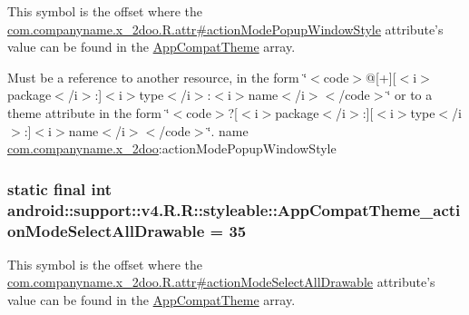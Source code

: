 This symbol is the offset where the \hyperlink{classcom_1_1companyname_1_1x__2doo_1_1_r_1_1attr_2c277af2d5ce1caa9df550b48a1d5a8f}{com.companyname.x\_\-2doo.R.attr\#actionModePopupWindowStyle} attribute's value can be found in the \hyperlink{classandroid_1_1support_1_1v4_1_1_r_1_1styleable_0873e92ba21076bb5a4aeadeb7f5779f}{AppCompatTheme} array.

Must be a reference to another resource, in the form \char`\"{}$<$code$>$@\mbox{[}+\mbox{]}\mbox{[}$<$i$>$package$<$/i$>$:\mbox{]}$<$i$>$type$<$/i$>$:$<$i$>$name$<$/i$>$$<$/code$>$\char`\"{} or to a theme attribute in the form \char`\"{}$<$code$>$?\mbox{[}$<$i$>$package$<$/i$>$:\mbox{]}\mbox{[}$<$i$>$type$<$/i$>$:\mbox{]}$<$i$>$name$<$/i$>$$<$/code$>$\char`\"{}.  name \hyperlink{namespacecom_1_1companyname_1_1x__2doo}{com.companyname.x\_\-2doo}:actionModePopupWindowStyle \hypertarget{classandroid_1_1support_1_1v4_1_1_r_1_1styleable_161a3ac1577d6c574603d52de21d3d13}{
\subsubsection[{AppCompatTheme\_\-actionModeSelectAllDrawable}]{\setlength{\rightskip}{0pt plus 5cm}static final int android::support::v4.R.R::styleable::AppCompatTheme\_\-actionModeSelectAllDrawable = 35}}
\label{classandroid_1_1support_1_1v4_1_1_r_1_1styleable_161a3ac1577d6c574603d52de21d3d13}


This symbol is the offset where the \hyperlink{classcom_1_1companyname_1_1x__2doo_1_1_r_1_1attr_58a4ca000581e80bded2b6c11a265df5}{com.companyname.x\_\-2doo.R.attr\#actionModeSelectAllDrawable} attribute's value can be found in the \hyperlink{classandroid_1_1support_1_1v4_1_1_r_1_1styleable_0873e92ba21076bb5a4aeadeb7f5779f}{AppCompatTheme} array.

